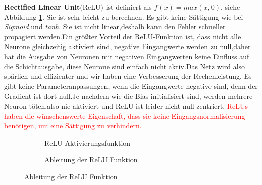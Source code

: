 \documentclass[12pt,a4paper]{scrartcl}
\numberwithin{equation}{section}
\begin{document}
\textbf{Rectified Linear Unit}(ReLU) ist definiert als $f(x)= max(x,0) $, siehe Abbildung \ref{fig:relu}. Sie ist sehr leicht zu berechnen. Es gibt keine Sättigung wie bei \textit{Sigmoid} und \textit{tanh}. Sie ist nicht linear,deshalb kann den Fehler schneller propagiert werden.Ein größter Vorteil der ReLU-Funktion ist, dass nicht alle Neurone gleichzeitig aktiviert sind, negative Eingangwerte werden zu null,daher hat die Ausgabe von Neuronen mit negativen Eingangwerten keine Einfluss auf die Schichtausgabe, diese Neurone sind einfach nicht aktiv.Das Netz wird also spärlich und effizienter und wir haben eine Verbesserung der Rechenleistung.
Es gibt keine Parameteranpassungen, wenn die Eingangwerte negative sind, denn der Gradient ist dort null.Je nachdem wie die Bias initialisiert sind, werden mehrere Neuron töten,also nie aktiviert und ReLU ist leider nicht null zentriert. \textcolor{red}{ReLUs haben die wünschenswerte Eigenschaft, dass sie keine Eingangsnormalisierung benötigen, um eine Sättigung zu verhindern.}
\begin{figure}[h]
	\caption{ReLU Aktivierungsfunktion}
	\begin{subfigure}{.5\textwidth}
		\centering
		\caption{ReLU Aktivierungsfunktion}
		
	\end{subfigure}%
	\begin{subfigure}{.5\textwidth}
		\centering
		\caption{Ableitung der ReLU Funktion}
		
	\end{subfigure}
	\label{fig:relu}
\end{figure}
\end{document}
